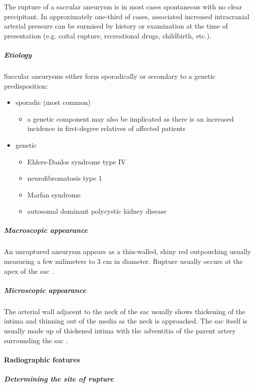 The rupture of a saccular aneurysm is in most cases spontaneous with no clear precipitant. In approximately one-third of cases, associated increased intracranial arterial pressure can be surmised by history or examination at the time of presentation (e.g. coital rupture, recreational drugs, childbirth, etc.).

\subparagraph{Etiology}

Saccular aneurysms either form sporadically or secondary to a genetic predisposition:

\begin{itemize}
	\item
	sporadic (most common)
	
	\begin{itemize}
		\item
		a genetic component may also be implicated as there is an increased incidence in first-degree relatives of affected patients
	\end{itemize}
	\item
	genetic
	
	\begin{itemize}
		\item
		Ehlers-Danlos syndrome type IV
		\item
		neurofibromatosis type 1
		\item
		Marfan syndrome
		\item
		autosomal dominant polycystic kidney disease
	\end{itemize}
\end{itemize}

\subparagraph{Macroscopic appearance}

An unruptured aneurysm appears as a thin-walled, shiny red outpouching usually measuring a few milimeters to 3 cm in diameter. Rupture usually occurs at the apex of the sac .

\subparagraph{Microscopic appearance}

The arterial wall adjacent to the neck of the sac usually shows thickening of the intima and thinning out of the media as the neck is approached. The sac itself is usually made up of thickened intima with the adventitia of the parent artery surrounding the sac .

\paragraph{Radiographic features}

\subparagraph{Determining the site of rupture}

